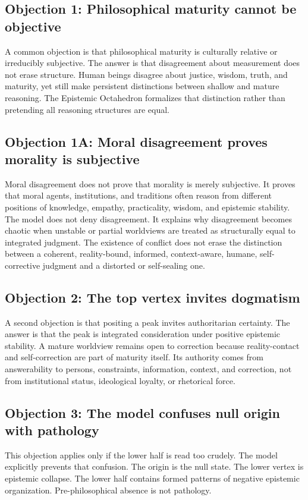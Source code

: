 \documentclass[11pt]{article}
\begin{document}
\subsection{Objection 1: Philosophical maturity cannot be objective}
A common objection is that philosophical maturity is culturally relative or irreducibly subjective. The answer is that disagreement about measurement does not erase structure. Human beings disagree about justice, wisdom, truth, and maturity, yet still make persistent distinctions between shallow and mature reasoning. The Epistemic Octahedron formalizes that distinction rather than pretending all reasoning structures are equal.

\subsection{Objection 1A: Moral disagreement proves morality is subjective}
Moral disagreement does not prove that morality is merely subjective. It proves that moral agents, institutions, and traditions often reason from different positions of knowledge, empathy, practicality, wisdom, and epistemic stability. The model does not deny disagreement. It explains why disagreement becomes chaotic when unstable or partial worldviews are treated as structurally equal to integrated judgment. The existence of conflict does not erase the distinction between a coherent, reality-bound, informed, context-aware, humane, self-corrective judgment and a distorted or self-sealing one.

\subsection{Objection 2: The top vertex invites dogmatism}
A second objection is that positing a peak invites authoritarian certainty. The answer is that the peak is integrated consideration under positive epistemic stability. A mature worldview remains open to correction because reality-contact and self-correction are part of maturity itself. Its authority comes from answerability to persons, constraints, information, context, and correction, not from institutional status, ideological loyalty, or rhetorical force.

\subsection{Objection 3: The model confuses null origin with pathology}
This objection applies only if the lower half is read too crudely. The model explicitly prevents that confusion. The origin is the null state. The lower vertex is epistemic collapse. The lower half contains formed patterns of negative epistemic organization. Pre-philosophical absence is not pathology.
\end{document}
